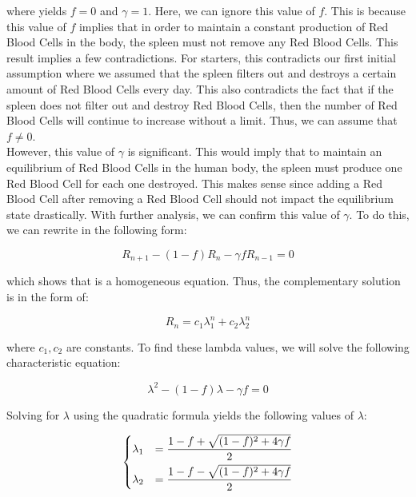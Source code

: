 where  yields $f=0$ and $\gamma=1$. Here, we can ignore this value of $f$. This is because this value of $f$ implies that in order to maintain a constant production of Red Blood Cells in the body, the spleen must not remove any Red Blood Cells. This result implies a few contradictions. For starters, this contradicts our first initial assumption where we assumed that the spleen filters out and destroys a certain amount of Red Blood Cells every day. This also contradicts the fact that if the spleen does not filter out and destroy Red Blood Cells, then the number of Red Blood Cells will continue to increase without a limit. Thus, we can assume that $f\neq0$.\\

However, this value of $\gamma$ is significant. This would imply that to maintain an equilibrium of Red Blood Cells in the human body, the spleen must produce one Red Blood Cell for each one destroyed. This makes sense since adding a Red Blood Cell after removing a Red Blood Cell should not impact the equilibrium state drastically. With further analysis, we can confirm this value of $\gamma$. To do this, we can rewrite  in the following form:

\begin{equation}
    R_{n+1} - (1-f)R_n - \gamma fR_{n-1} = 0
    \label{eq:linear-difference-model-equation-2}
\end{equation}

which shows that  is a homogeneous equation. Thus, the complementary solution is in the form of:

\begin{equation*}
    R_n = c_1\lambda_1^n + c_2\lambda_2^n
\end{equation*}

where $c_1,c_2$ are constants. To find these lambda values, we will solve the following characteristic equation:

\begin{equation}
    \lambda^2 - (1 - f)\lambda - \gamma f = 0
    \label{eq:linear-difference-model-characteristic-equation}
\end{equation}

Solving  for $\lambda$ using the quadratic formula yields the following values of $\lambda$:

\[
\begin{dcases}
    \lambda_1 &= \frac{1-f + \sqrt{(1-f)^2 + 4\gamma f}}{2}\\
    \lambda_2 &= \frac{1-f - \sqrt{(1-f)^2 + 4\gamma f}}{2}
\end{dcases}
\]

